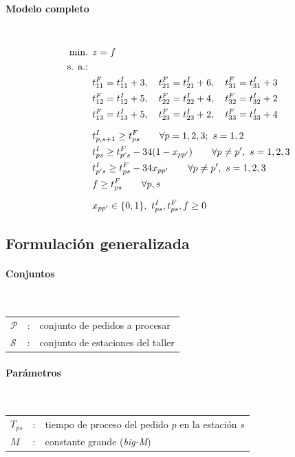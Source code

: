 \paragraph{Modelo completo}\mbox{}\\

\begin{align}
\mbox{min. } & z = f \notag \\
\mbox{s. a.: } & \notag \\
&t^F_{11}=t^I_{11}+3, \quad t^F_{21}=t^I_{21}+6, \quad t^F_{31}=t^I_{31}+3 \notag\\
&t^F_{12}=t^I_{12}+5, \quad t^F_{22}=t^I_{22}+4, \quad t^F_{32}=t^I_{32}+2 \notag\\
&t^F_{13}=t^I_{13}+5, \quad t^F_{23}=t^I_{23}+2, \quad t^F_{33}=t^I_{33}+4 \notag\\[2mm]
&t^I_{p,s+1} \ge t^F_{ps} \qquad \forall p=1,2,3;\ s=1,2 \notag\\
&t^I_{ps} \ge t^F_{p's} - 34(1-x_{pp'}) \qquad \forall p\ne p',\ s=1,2,3 \notag\\
&t^I_{p's} \ge t^F_{ps} - 34x_{pp'} \qquad \forall p\ne p',\ s=1,2,3 \notag\\
&f \ge t^F_{ps} \qquad \forall p,s \notag\\[2mm]
&x_{pp'} \in \{0,1\},\ t^I_{ps},t^F_{ps},f \ge 0 \notag
\end{align}

\subsection{Formulación generalizada}

\paragraph{Conjuntos}\mbox{}\\
\begin{tabular}{l c l}
$\mathcal{P}$ & : & conjunto de pedidos a procesar \\
$\mathcal{S}$ & : & conjunto de estaciones del taller \\
\end{tabular}

\paragraph{Parámetros}\mbox{}\\
\begin{tabular}{l c l}
$T_{ps}$ & : & tiempo de proceso del pedido $p$ en la estación $s$ \\
$M$ & : & constante grande (\textit{big-M}) \\
\end{tabular}

